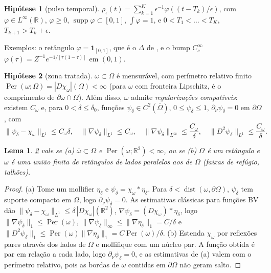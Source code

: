 \documentclass[11pt,a4paper]{article}
\numberwithin{equation}{section}
\newtheorem{lema}[teorema]{Lema}
\theoremstyle{definition}
\newtheorem{hipotese}{Hipótese}
\theoremstyle{remark}
\newcommand{\R}{\mathbb{R}}
\newcommand{\Per}{\operatorname{Per}}
\begin{document}
\begin{hipotese}[pulso temporal]\label{H1}
$\rho_\epsilon(t)=\sum_{k=1}^K\epsilon^{-1}\varphi((t-T_k)/\epsilon)$, com $\varphi\in L^\infty(\R)$,
$\varphi\ge0$, $\operatorname{supp}\varphi\subset[0,1]$, $\int\varphi=1$, e
$0<T_1<\dots<T_K$, $T_{k+1}>T_k+\epsilon$.
\end{hipotese}

Exemplos: o retângulo $\varphi=\mathbf 1_{[0,1]}$, que é o $\Delta$ de \cite{LiYang}, e o bump
$C^\infty_c$ $\varphi(\tau)=Z^{-1}e^{-1/[\tau(1-\tau)]}$ em $(0,1)$.

\begin{hipotese}[zona tratada]\label{H2}
$\omega\subset\Omega$ é mensurável, com perímetro relativo finito
$\Per(\omega;\Omega)=|D\chi_\omega|(\Omega)<\infty$ (para $\omega$ com fronteira Lipschitz, é o
comprimento de $\partial\omega\cap\Omega$). Além disso, $\omega$ admite \emph{regularizações
compatíveis}: existem $C_\omega$ e, para $0<\delta\le\delta_0$, funções $\psi_\delta\in C^2(\overline\Omega)$,
$0\le\psi_\delta\le1$, $\partial_\nu\psi_\delta=0$ em $\partial\Omega$, com
\begin{equation}\label{eq:reg}
\|\psi_\delta-\chi_\omega\|_{L^1}\le C_\omega\delta,\quad
\|\nabla\psi_\delta\|_{L^1}\le C_\omega,\quad
\|\nabla\psi_\delta\|_{L^\infty}\le \frac{C_\omega}\delta,\quad
\|D^2\psi_\delta\|_{L^1}\le\frac{C_\omega}\delta .
\end{equation}
\end{hipotese}

\begin{lema}\label{lem:reg}
\ref{H2} vale se (a) $\overline\omega\subset\Omega$ e $\Per(\omega;\R^2)<\infty$, ou se (b) $\Omega$ é um
retângulo e $\omega$ é uma união finita de retângulos de lados paralelos aos de $\Omega$
(faixas de refúgio, talhões).
\end{lema}

\begin{proof}
(a) Tome um mollifier $\eta_\delta$ e $\psi_\delta=\chi_\omega*\eta_\delta$. Para
$\delta<\operatorname{dist}(\omega,\partial\Omega)$, $\psi_\delta$ tem suporte compacto em $\Omega$, logo
$\partial_\nu\psi_\delta=0$. As estimativas clássicas para funções BV \cite{EvansGariepy,AFP} dão
$\|\psi_\delta-\chi_\omega\|_{L^1}\le\delta\,|D\chi_\omega|(\R^2)$,
$\nabla\psi_\delta=(D\chi_\omega)*\eta_\delta$, logo $\|\nabla\psi_\delta\|_1\le\Per(\omega)$,
$\|\nabla\psi_\delta\|_\infty\le\|\nabla\eta_\delta\|_{1}=C/\delta$ e
$\|D^2\psi_\delta\|_1\le\Per(\omega)\|\nabla\eta_\delta\|_1=C\Per(\omega)/\delta$.
(b) Estenda $\chi_\omega$ por reflexões pares através dos lados de $\Omega$ e mollifique com um
núcleo par. A função obtida é par em relação a cada lado, logo $\partial_\nu\psi_\delta=0$, e as
estimativas de (a) valem com o perímetro relativo, pois as bordas de $\omega$ contidas em
$\partial\Omega$ não geram salto.
\end{proof}
\end{document}

